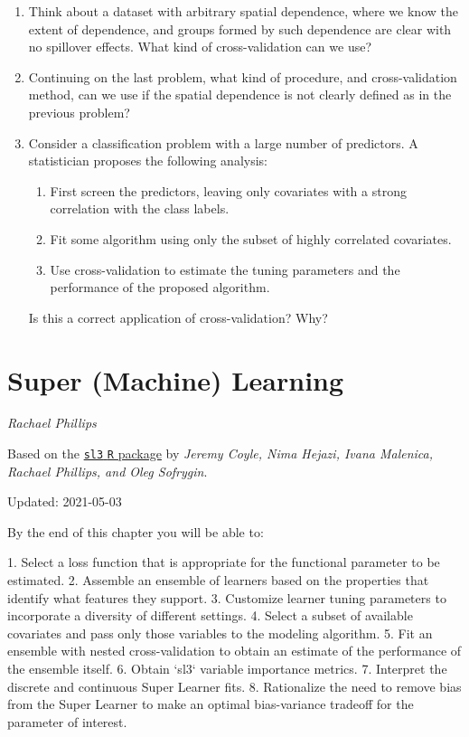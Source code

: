 \documentclass[12pt, krantz2,]{krantz}
\newcommand{\passthrough}[1]{#1}
\providecommand{\tightlist}{%
  \setlength{\itemsep}{0pt}\setlength{\parskip}{0pt}}
\theoremstyle{definition}
\theoremstyle{definition}
\theoremstyle{definition}
\newcommand{\1}{\mathbbm{1}}
\begin{document}
\begin{enumerate}
\def\labelenumi{\arabic{enumi}.}
\item
  Think about a dataset with arbitrary spatial dependence, where we know
  the extent of dependence, and groups formed by such dependence are clear
  with no spillover effects. What kind of cross-validation can we use?
\item
  Continuing on the last problem, what kind of procedure, and cross-validation
  method, can we use if the spatial dependence is not clearly defined as in the
  previous problem?
\item
  Consider a classification problem with a large number of predictors. A
  statistician proposes the following analysis:

  \begin{enumerate}
  \def\labelenumii{\alph{enumii}.}
  \tightlist
  \item
    First screen the predictors, leaving only covariates with a strong
    correlation with the class labels.
  \item
    Fit some algorithm using only the subset of highly correlated covariates.
  \item
    Use cross-validation to estimate the tuning parameters and the performance
    of the proposed algorithm.
  \end{enumerate}

  Is this a correct application of cross-validation? Why?
\end{enumerate}

\hypertarget{sl3}{%
\chapter{Super (Machine) Learning}\label{sl3}}

\emph{Rachael Phillips}

Based on the \href{https://github.com/tlverse/sl3}{\passthrough{\lstinline!sl3!} \passthrough{\lstinline!R!} package} by \emph{Jeremy
Coyle, Nima Hejazi, Ivana Malenica, Rachael Phillips, and Oleg Sofrygin}.

Updated: 2021-05-03

\begin{VT1}



By the end of this chapter you will be able to:

1. Select a loss function that is appropriate for the functional parameter to
   be estimated.
2. Assemble an ensemble of learners based on the properties that identify what
   features they support.
3. Customize learner tuning parameters to incorporate a diversity of different
   settings.
4. Select a subset of available covariates and pass only those variables to the
   modeling algorithm.
5. Fit an ensemble with nested cross-validation to obtain an estimate of the
   performance of the ensemble itself.
6. Obtain `sl3` variable importance metrics.
7. Interpret the discrete and continuous Super Learner fits.
8. Rationalize the need to remove bias from the Super Learner to make an
   optimal bias-variance tradeoff for the parameter of interest.

\end{VT1}
\end{document}
